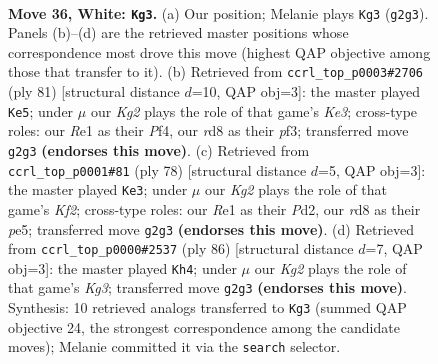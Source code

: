 \documentclass[11pt]{article}
\begin{document}
\clearpage

\begin{figure}[p]\centering
\begin{subfigure}{0.46\textwidth}\centering
\resizebox{\linewidth}{!}{%
\newchessgame
\chessboard[
  setfen={3r4/6k1/8/8/p5p1/P7/6KP/4R3 w - - 6 36},
  showmover=false,
  pgfstyle=straightmove, color=movearrow, markmove={g2-g3}
]}
\caption{}
\end{subfigure}\hfill
\begin{subfigure}{0.46\textwidth}\centering
\resizebox{\linewidth}{!}{%
\newchessgame
\chessboard[
  setfen={8/8/2K1kp2/7p/4Pp2/5P1P/8/8 b - - 2 41},
  showmover=false,
  pgfstyle=straightmove, color=movearrow, markmove={e6-e5}
]}
\caption{}
\end{subfigure}
\\[4pt]
\begin{subfigure}{0.46\textwidth}\centering
\resizebox{\linewidth}{!}{%
\newchessgame
\chessboard[
  setfen={8/5k1p/7P/4p3/6p1/6P1/3P1K2/8 w - - 2 40},
  showmover=false,
  pgfstyle=straightmove, color=movearrow, markmove={f2-e3}
]}
\caption{}
\end{subfigure}\hfill
\begin{subfigure}{0.46\textwidth}\centering
\resizebox{\linewidth}{!}{%
\newchessgame
\chessboard[
  setfen={8/p5k1/8/P6p/5P2/6K1/8/8 w - - 3 44},
  showmover=false,
  pgfstyle=straightmove, color=movearrow, markmove={g3-h4}
]}
\caption{}
\end{subfigure}
\caption{\textbf{Move 36, White: \texttt{Kg3}.} (a) Our position; Melanie plays \texttt{Kg3} (\texttt{g2g3}). Panels (b)--(d) are the retrieved master positions whose correspondence most drove this move (highest QAP objective among those that transfer to it). (b) Retrieved from \texttt{ccrl\_top\_p0003\#2706} (ply 81) [structural distance $d$=10, QAP obj=3]: the master played \texttt{Ke5}; under $\mu$ our \emph{Kg2} plays the role of that game's \emph{Ke3}; cross-type roles: our \emph{R}e1 as their \emph{P}f4, our \emph{r}d8 as their \emph{p}f3; transferred move \texttt{g2g3} \textbf{(endorses this move)}. (c) Retrieved from \texttt{ccrl\_top\_p0001\#81} (ply 78) [structural distance $d$=5, QAP obj=3]: the master played \texttt{Ke3}; under $\mu$ our \emph{Kg2} plays the role of that game's \emph{Kf2}; cross-type roles: our \emph{R}e1 as their \emph{P}d2, our \emph{r}d8 as their \emph{p}e5; transferred move \texttt{g2g3} \textbf{(endorses this move)}. (d) Retrieved from \texttt{ccrl\_top\_p0000\#2537} (ply 86) [structural distance $d$=7, QAP obj=3]: the master played \texttt{Kh4}; under $\mu$ our \emph{Kg2} plays the role of that game's \emph{Kg3}; transferred move \texttt{g2g3} \textbf{(endorses this move)}. Synthesis: 10 retrieved analogs transferred to \texttt{Kg3} (summed QAP objective 24, the strongest correspondence among the candidate moves); Melanie committed it via the \texttt{search} selector.}
\label{fig:thought-m70}
\end{figure}
\end{document}

